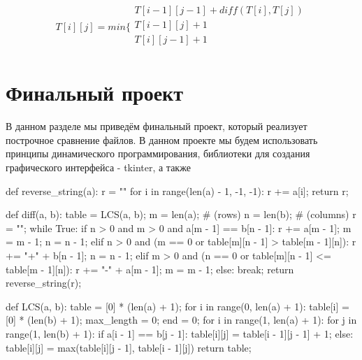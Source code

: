 
$$
T[i][j] = min \Bigg\{
	\begin{array}{c}
      T[i - 1][j - 1] + diff(T[i], T[j])\\
      T[i - 1][j] + 1 \\
      T[i][j - 1] + 1 \\
    \end{array}
$$

\chapter{Финальный проект}

В данном разделе мы приведём финальный проект, который реализует построчное сравнение 
файлов. В данном проекте мы будем использовать принципы динамического программирования,
библиотеки для создания графического интерфейса - tkinter, а также 


\begin{python}
def reverse_string(a):
	r = ""
	for i in range(len(a) - 1, -1, -1):
		r += a[i];
	return r;

def diff(a, b):
	table = LCS(a, b);
	m = len(a); # (rows) 
	n = len(b); # (columns)
	r = "";
	while True:
		if n > 0 and m > 0 and a[m - 1] == b[n - 1]:
			r += a[m - 1];
			m = m - 1;
			n = n - 1;
		elif n > 0 and (m == 0 or table[m][n - 1] > table[m - 1][n]):
			r += "+" + b[n - 1];
			n = n - 1;
		elif m > 0 and (n == 0 or table[m][n - 1] <= table[m - 1][n]):
			r += "-" + a[m - 1];
			m = m - 1;
		else:
			break;
	return reverse_string(r);

def LCS(a, b):
	table = [0] * (len(a) + 1);
	for i in range(0, len(a) + 1):
		table[i] = [0] * (len(b) + 1);
	max_length = 0;
	end = 0;
	for i in range(1, len(a) + 1):
		for j in range(1, len(b) + 1):
			if a[i - 1] == b[j - 1]:
				table[i][j] = table[i - 1][j - 1] + 1;
			else:
				table[i][j] = max(table[i][j - 1], table[i - 1][j])
	return table;

\end{python}

